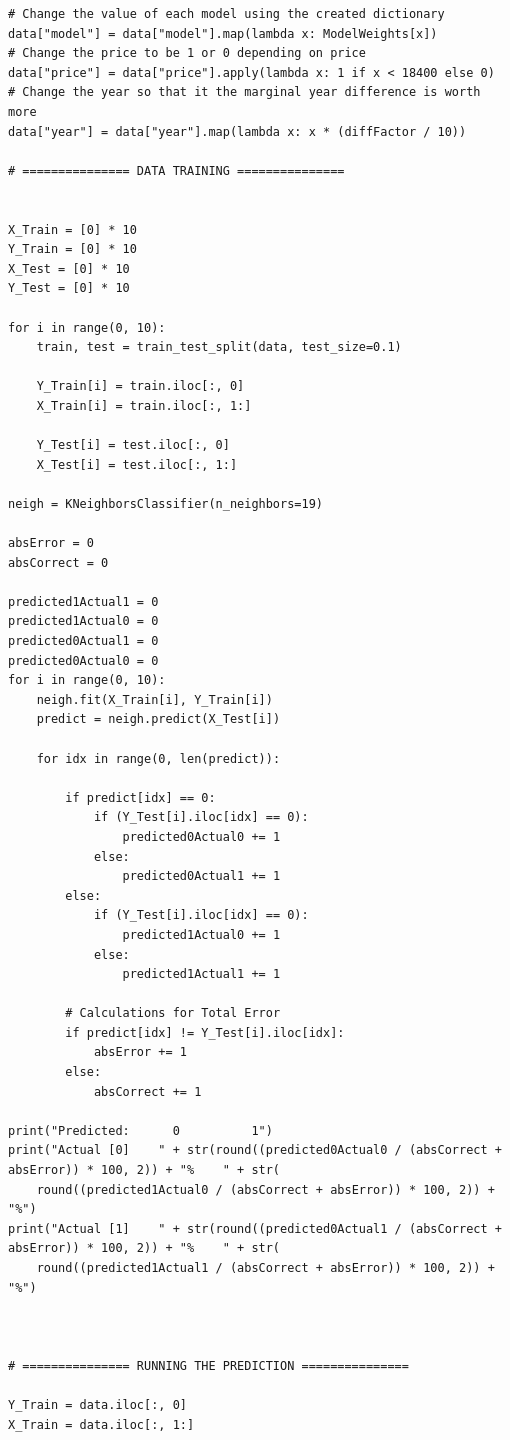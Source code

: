 \documentclass{article}
\begin{document}
\begin{lstlisting}
# Change the value of each model using the created dictionary
data["model"] = data["model"].map(lambda x: ModelWeights[x])
# Change the price to be 1 or 0 depending on price
data["price"] = data["price"].apply(lambda x: 1 if x < 18400 else 0)
# Change the year so that it the marginal year difference is worth more
data["year"] = data["year"].map(lambda x: x * (diffFactor / 10))

# =============== DATA TRAINING ===============


X_Train = [0] * 10
Y_Train = [0] * 10
X_Test = [0] * 10
Y_Test = [0] * 10

for i in range(0, 10):
    train, test = train_test_split(data, test_size=0.1)

    Y_Train[i] = train.iloc[:, 0]
    X_Train[i] = train.iloc[:, 1:]

    Y_Test[i] = test.iloc[:, 0]
    X_Test[i] = test.iloc[:, 1:]

neigh = KNeighborsClassifier(n_neighbors=19)

absError = 0
absCorrect = 0

predicted1Actual1 = 0
predicted1Actual0 = 0
predicted0Actual1 = 0
predicted0Actual0 = 0
for i in range(0, 10):
    neigh.fit(X_Train[i], Y_Train[i])
    predict = neigh.predict(X_Test[i])

    for idx in range(0, len(predict)):

        if predict[idx] == 0:
            if (Y_Test[i].iloc[idx] == 0):
                predicted0Actual0 += 1
            else:
                predicted0Actual1 += 1
        else:
            if (Y_Test[i].iloc[idx] == 0):
                predicted1Actual0 += 1
            else:
                predicted1Actual1 += 1

        # Calculations for Total Error
        if predict[idx] != Y_Test[i].iloc[idx]:
            absError += 1
        else:
            absCorrect += 1

print("Predicted:      0          1")
print("Actual [0]    " + str(round((predicted0Actual0 / (absCorrect + absError)) * 100, 2)) + "%    " + str(
    round((predicted1Actual0 / (absCorrect + absError)) * 100, 2)) + "%")
print("Actual [1]    " + str(round((predicted0Actual1 / (absCorrect + absError)) * 100, 2)) + "%    " + str(
    round((predicted1Actual1 / (absCorrect + absError)) * 100, 2)) + "%")



# =============== RUNNING THE PREDICTION ===============

Y_Train = data.iloc[:, 0]
X_Train = data.iloc[:, 1:]


\end{lstlisting}
\end{document}
